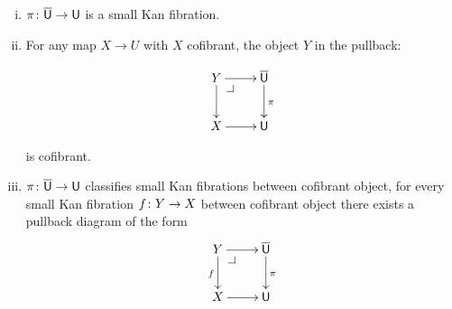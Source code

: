 \documentclass[reqno,10pt,a4paper,oneside,draft]{amsart}
\begin{document}
\begin{proposition} \label{thm:universe-u}  \hfill 
\begin{enumerate}[(i)] 
\item $\pi \colon \overline{\mathsf{U}} \to \mathsf{U}$ is a small Kan fibration.
\item For any map $X \rightarrow U$ with $X$ cofibrant, the object $Y$ in the pullback:

\[
\xymatrix{
Y \ar[r] \ar[d] \drpullback & \UU \ar[d]^\pi \\
X \ar[r] & \U }
\]

is cofibrant.

\item $\pi \colon \overline{\mathsf{U}} \to \mathsf{U}$ classifies small Kan fibrations between cofibrant object, \ie 
for every small Kan fibration $f \colon Y \to X$ between cofibrant object there exists a pullback diagram of the form
\[
\xymatrix{
Y \ar[r] \ar[d]_f \drpullback & \UU \ar[d]^\pi \\
X \ar[r] & \U }
\]

\end{enumerate}
\end{proposition}
\end{document}
